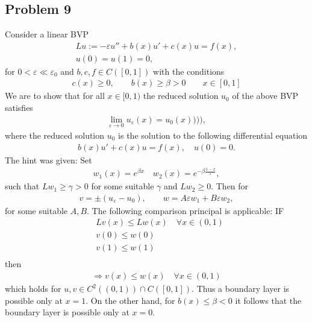 \documentclass[a4paper]{article}
\newcommand{\eps}{\varepsilon}
\begin{document}
\subsection{Problem 9}
Consider a linear BVP
\begin{align}
    Lu := -\eps u'' + b(x)u' + c(x)u = f(x),\\
    u(0) = u(1) = 0,
\end{align}
for $0 < \eps \ll \eps_0$ and $b, c, f \in C([0,1])$ with the conditions
\begin{align}
    c(x) \geq 0, \qquad b(x) \geq \beta > 0 \qquad x\in[0, 1]
\end{align}
We are to show that for all $x\in[0, 1)$ the reduced solution $u_0$ of the
above BVP satisfies
\begin{align}
    \lim_{\eps \rightarrow 0} u_\eps(x) = u_0(x)))),
\end{align}
where the reduced solution $u_0$ is the solution to the following
differential equation
\begin{align}
    b(x)u' + c(x)u = f(x), \quad u(0) = 0.
\end{align}
The hint was given: Set
\begin{align}
    w_1(x) = e^{\beta x} \quad w_2(x) = e^{-\beta\frac{1-x}{\eps}},
\end{align}
such that $Lw_1 \geq \gamma > 0$ for some suitable $\gamma$ and $Lw_2 \geq
0$. Then for
\begin{align}
    v = \pm (u_\eps - u_0), \qquad w = A\eps w_1 + B\eps w_2,
\end{align}
for some suitable $A, B$. The following comparison principal is applicable:
IF
\begin{align}
    &Lv(x) \leq Lw(x) \quad \forall x \in (0, 1) \label{eq:cond1}\\
    &v(0) \leq w(0)  \label{eq:cond2}\\
    &v(1) \leq w(1) \label{eq:cond3}\\
\end{align}
then
\begin{align}
    \Longrightarrow v(x) \leq w(x) \quad \forall x\in(0, 1)
\end{align}
which holds for $u, v \in C^2((0, 1)) \cap C([0, 1])$. Thus a boundary layer
is possible only at $x=1$. On the other hand, for $b(x) \leq \beta < 0$ it
follows that the boundary layer is possible only at $x=0$.
\end{document}
